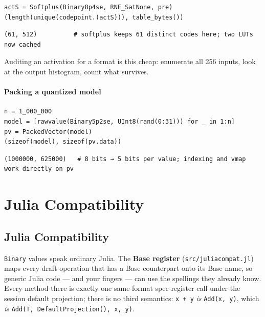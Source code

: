 \begin{verbatim}
actS = Softplus(Binary8p4se, RNE_SatNone, pre)
(length(unique(codepoint.(actS))), table_bytes())
\end{verbatim}




\begin{verbatim}
(61, 512)          # softplus keeps 61 distinct codes here; two LUTs now cached
\end{verbatim}



Auditing an activation for a format is this cheap: enumerate all 256 inputs, look at the output histogram, count what survives.



\subsection{Packing a quantized model}



\label{856710218023185633}{}



\begin{verbatim}
n = 1_000_000
model = [rawvalue(Binary5p2se, UInt8(rand(0:31))) for _ in 1:n]
pv = PackedVector(model)
(sizeof(model), sizeof(pv.data))
\end{verbatim}




\begin{verbatim}
(1000000, 625000)   # 8 bits → 5 bits per value; indexing and vmap work directly on pv
\end{verbatim}



\part{Julia Compatibility}


\chapter{Julia Compatibility}



\label{10344462847155476790}{}


\texttt{Binary} values speak ordinary Julia. The \textbf{Base register} (\texttt{src/juliacompat.jl}) maps every draft operation that has a Base counterpart onto its Base name, so generic Julia code — and your fingers — can use the spellings they already know. Every method there is exactly one same-format spec-register call under the session default projection; there is no third semantics: \texttt{x + y} \emph{is} \texttt{Add(x, y)}, which \emph{is} \texttt{Add(T, DefaultProjection(), x, y)}.



